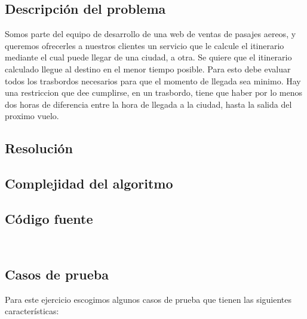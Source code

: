 \subsection{Descripci\'on del problema}

Somos parte del equipo de desarrollo de una web de ventas de pasajes aereos, y queremos ofrecerles a nuestros clientes un servicio que le calcule el itinerario mediante el cual puede llegar de una ciudad, a otra. Se quiere que el itinerario calculado llegue al destino en el menor tiempo posible. Para esto debe evaluar todos los trasbordos necesarios para que el momento de llegada sea minimo.
Hay una restriccion que dee cumplirse, en un trasbordo, tiene que haber por lo menos dos horas de diferencia entre la hora de llegada a la ciudad, hasta la salida del proximo vuelo. 

\subsection{Resoluci\'on}





\subsection{Complejidad del algoritmo}


\subsection{C\'odigo fuente}

\begin{lstlisting}


\end{lstlisting}

\subsection{Casos de prueba}

Para este ejercicio escogimos algunos casos de prueba que tienen las siguientes características:

